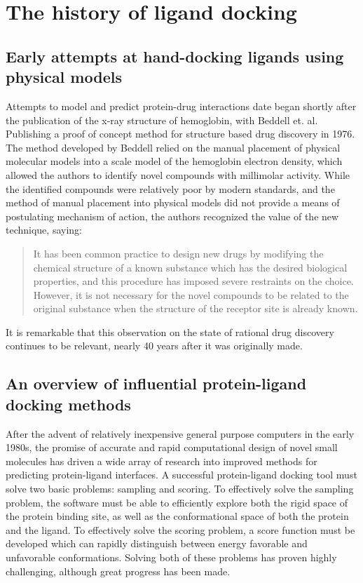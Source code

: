 \section{The history of ligand docking}

\subsection{Early attempts at hand-docking ligands using physical models}
Attempts to model and predict protein-drug interactions date began shortly after the publication of the x-ray structure of hemoglobin, with Beddell et. al. Publishing a proof of concept method for structure based drug discovery in 1976\citep{BEDDELL:1976go}.
The method developed by Beddell relied on the manual placement of physical molecular models into a scale model of the hemoglobin electron density, which allowed the authors to identify novel compounds with millimolar activity. 
While the identified compounds were relatively poor by modern standards, and the method of manual placement into physical models did not provide a means of postulating mechanism of action, the authors recognized the value of the new technique, saying:
\begin{quote}
It has been common practice to design new drugs by modifying the chemical structure of a known substance which has the desired biological properties, and this procedure has imposed severe restraints on the choice.
However, it is not necessary for the novel compounds to be related to the original substance when the structure of the receptor site is already known. 
\end{quote}
It is remarkable that this observation on the state of rational drug discovery continues to be relevant, nearly 40 years after it was originally made. 

\subsection{An overview of influential protein-ligand docking methods}
After the advent of relatively inexpensive general purpose computers in the early 1980s, the promise of accurate and rapid computational design of novel small molecules has driven a wide array of research into improved methods for predicting protein-ligand interfaces.
A successful protein-ligand docking tool must solve two basic problems: sampling and scoring.
To effectively solve the sampling problem, the software must be able to efficiently explore both the rigid space of the protein binding site, as well as the conformational space of both 	the protein and the ligand.
To effectively solve the scoring problem, a score function must be developed which can rapidly distinguish between energy favorable and unfavorable conformations.
Solving both of these problems has proven highly challenging, although great progress has been made. 

